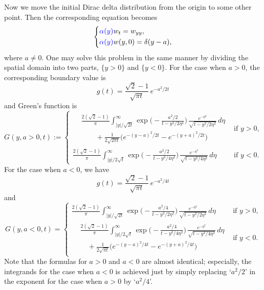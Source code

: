 \documentclass[11pt]{amsart}
\def\blue{\color{blue}}
\begin{document}
Now we move the initial Dirac delta distribution from the origin to some other point. Then the corresponding equation becomes
\[ \left\{ \begin{aligned}
&{\blue \alpha(y)}w_t = w_{yy}, \\
&{\blue \alpha(y)}w(y,0) = \delta(y-a),
\end{aligned} \right. \]
where $a\ne0$. One may solve this problem in the same manner by dividing the spatial domain into two parts,  $\{y>0\}$ and $\{y<0\}$. For the case when $a > 0$, the corresponding boundary value is
\[
g(t)= \frac{\sqrt{2} - 1}{\sqrt{\pi t}} \,e^{-a^2/2t}
\]
and Green's function is
\begin{equation}\label{G+}
G(y,a>0,t):=
\begin{cases}
\begin{split}
& \textstyle \frac{2(\sqrt{2}-1)}{\pi} \int_{|y|/\sqrt{2 t}}^\infty \exp\Big(- \frac{a^2/2}{t - y^2/2\eta^2}\Big)  \, \frac{e^{-\eta^2}}{\sqrt{t - y^2/2\eta^2}} \,d\eta\\
& \textstyle \qquad + \frac{1}{2\sqrt{2\pi t}} \big( e^{-(y-a)^2/2t} - e^{-(y+a)^2/2t} \big)
\end{split}
& \text{if $y>0$,} \\
\frac{2(\sqrt{2}-1)}{\pi} \int_{|y|/2\sqrt{t}}^\infty \exp\Big( -\frac{a^2/2}{t-y^2/4\eta^2} \Big) \, \frac{e^{-\eta^2}}{\sqrt{t - y^2/4\eta^2}} \,d\eta & \text{if $y < 0$.}
\end{cases}
\end{equation}
For the case when $a < 0$, we have
\[ g(t) = \frac{\sqrt{2} - 1}{\sqrt{\pi t}} \,e^{-a^2/4t} \]
and
\begin{equation}\label{G-}
G(y,a<0,t)=\begin{cases}
\frac{2(\sqrt{2}-1)}{\pi} \int_{|y|/\sqrt{2t}}^\infty \exp\Big( -\frac{a^2/4}{t-y^2/2\eta^2} \Big) \, \frac{e^{-\eta^2}}{\sqrt{t - y^2/2\eta^2}} \,d\eta & \text{if $y > 0$,} \\
\begin{split}
& \textstyle \frac{2(\sqrt{2}-1)}{\pi} \int_{|y|/2\sqrt{t}}^\infty \exp\Big( - \frac{a^2/4}{t - y^2/4\eta^2} \Big) \, \frac{e^{-\eta^2}}{\sqrt{t - y^2/4\eta^2}} \,d\eta \\
& \textstyle \quad + \frac{1}{2\sqrt{\pi t}} \big( e^{-(y-a)^2/4t} - e^{-(y+a)^2/4t} \big)
\end{split}
& \text{if $y < 0$.}
\end{cases}
\end{equation}
Note that the formulas for $a > 0$ and $a < 0$ are almost identical; especially, the integrands for the case when $a < 0$ is achieved just by simply replacing `$a^2/2$' in the exponent for the case when $a > 0$ by `$a^2/4$'.
\end{document}
